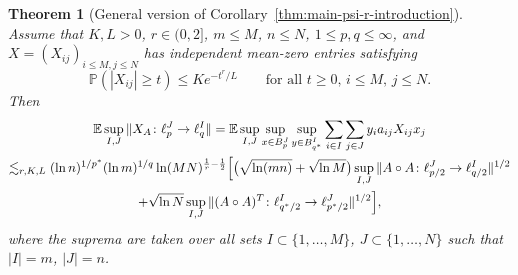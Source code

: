 \documentclass[a4paper]{amsart}
\newtheorem{theorem}{Theorem}[section]
\theoremstyle{definition}
\theoremstyle{remark}
\numberwithin{equation}{section}
\newcommand*{\EE}{\mathbb{E}}
\newcommand*{\PP}{\mathbb{P}}
\newcommand*{\hadprod}{\mathbin{\circ}} %
\begin{document}
\begin{theorem}[General version of Corollary~\ref{thm:main-psi-r-introduction}]
\label{thm:main-psi-r}
	Assume that $K,L >0$, $r\in(0,2]$, $m\le M$, $n\le N$, $1\leq p,q \leq \infty$, and $X=(X_{ij})_{i\leq M, j\leq N}$ has independent mean-zero entries satisfying
	\[
	\PP(|X_{ij}|\ge t) \le Ke^{-t^r/L} \qquad \text{for all } t\ge 0,\, i\leq M,\,j\leq N.
	\]
	Then
\begin{multline*}
\EE \sup_{I, J} \|X_A\colon \ell_p^{J} \to \ell_q^{I} \|
=\EE \sup_{I, J} \sup_{x\in B_p^ {J}} \sup_{y\in B_{q^*}^ {I}} \sum_{i\in I} \sum_{j\in J} y_i a_{ij}X_{ij}x_j \\
 \lesssim_{r,K,L}  (\ln n)^{1/p^*}  (\ln m)^{1/q} \ln(MN)^{\frac 1r - \frac12} \Bigl[ \bigl( \sqrt{\ln(mn)}+\sqrt{\ln M}\bigr) \sup_{I,J} \|A\hadprod A \colon \ell^ {J}_{p/2} \to \ell^{ I}_{q/2}\|^{1/2}\\
  +\sqrt{\ln N} \sup_{I,J} \|(A\hadprod A)^T \colon \ell^{ I}_{q^*/2} \to \ell^ {J}_{p^*/2}\|^{1/2} \Bigr],
 \end{multline*}
 where  the suprema are taken over all sets $I\subset \{1,\ldots,M\}$, $J\subset \{1,\ldots,N\}$ such that $|I|=m$, $|J|=n$.
  	 \end{theorem}
	
\end{document}
